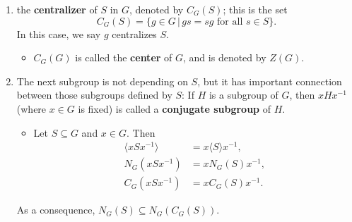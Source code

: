 \begin{enumerate}[(1)]
\begin{itemize}
	\end{itemize}
	\item the \textbf{centralizer} of $S$ in $G$, denoted by $C_G(S)$; this is the set
	\begin{equation*}
		C_G(S) = \{g\in G\,|\, gs = sg\text{ for all }s\in S\}.
	\end{equation*}
	In this case, we say $g$ centralizes $S$.
	\begin{itemize}
		\item $C_G(G)$ is called the \textbf{center} of $G$, and is denoted by $Z(G)$.
	\end{itemize}
	\item The next subgroup is not depending on $S$, but it has important connection between those subgroups defined by $S$: If $H$ is a subgroup of $G$, then $xHx^{-1}$ (where $x\in G$ is fixed) is called a \textbf{conjugate subgroup} of $H$.
	\begin{itemize}
		\item Let $S\subseteq G$ and $x\in G$. Then
		\begin{align*}
			\langle xSx^{-1}\rangle &=  x\langle S\rangle x^{-1},
			\\
			N_G(xSx^{-1}) &= xN_G(S)x^{-1} ,
			\\
		 C_G(xSx^{-1}) &= xC_G(S)x^{-1}.
		\end{align*}
	\end{itemize}
	As a consequence, $N_G(S)\subseteq N_G(C_G(S))$.
\end{enumerate}